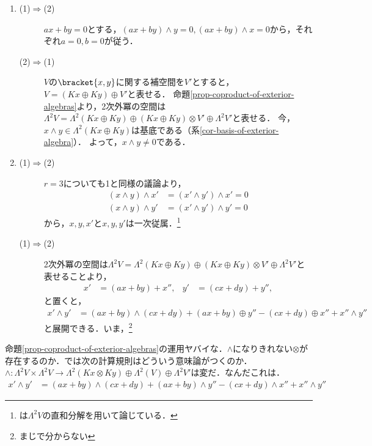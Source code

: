\documentclass[uplatex,dvipdfmx]{jsreport}
\begin{document}
\begin{Proof}\mbox{}
    \begin{enumerate}
        \item \begin{description}
            \item[(1)$\Rightarrow$(2)] $ax+by=0$とする，$(ax+by)\wedge y=0,(ax+by)\wedge x=0$から，それぞれ$a=0,b=0$が従う．
            \item[(2)$\Rightarrow$(1)] $V$の$\bracket{x,y}$に関する補空間を$V'$とすると，$V=(Kx\oplus Ky)\oplus V'$と表せる．
            命題\ref{prop-coproduct-of-exterior-algebras}より，2次外冪の空間は$\Lambda^2V=\Lambda^2(Kx\oplus Ky)\oplus(Kx\oplus Ky)\otimes V'\oplus\Lambda^2V'$と表せる．
            今，$x\wedge y\in\Lambda^2(Kx\oplus Ky)$は基底である（系\ref{cor-basis-of-exterior-algebra}）．
            よって，$x\wedge y\ne 0$である．
        \end{description}
        \item \begin{description}
            \item[(1)$\Rightarrow$(2)] $r=3$についても1と同様の議論より，
            \begin{align*}
                (x\wedge y)\wedge x'&=(x'\wedge y')\wedge x'=0\\
                (x\wedge y)\wedge y'&=(x'\wedge y')\wedge y'=0
            \end{align*}
            から，$x,y,x'$と$x,y,y'$は一次従属．\footnote{\cite{斎藤毅-線型代数}は$\Lambda^2V$の直和分解を用いて論じている．}
            \item[(1)$\Rightarrow$(2) \cite{斎藤毅-線型代数}] 
            2次外冪の空間は$\Lambda^2V=\Lambda^2(Kx\oplus Ky)\oplus(Kx\oplus Ky)\otimes V'\oplus\Lambda^2V'$と表せることより，
            \begin{align*}
                x'&=(ax+by)+x'',&y'&=(cx+dy)+y'',
            \end{align*}
            と置くと，
            \begin{align*}
                x'\wedge y'&=(ax+by)\wedge(cx+dy)+(ax+by)\oplus y''-(cx+dy)\oplus x''+x''\wedge y''
            \end{align*}
            と展開できる．いま，\footnote{まじで分からない}
        \end{description}
    \end{enumerate}
\end{Proof}
\begin{remarks}
    命題\ref{prop-coproduct-of-exterior-algebras}の運用ヤバイな．$\wedge$になりきれない$\otimes$が存在するのか．では次の計算規則はどういう意味論がつくのか．$\wedge:\Lambda^2V\times\Lambda^2V\to\Lambda^2(Kx\otimes Ky)\oplus\Lambda^2(V)\oplus\Lambda^2V'$は変だ．なんだこれは．
    \begin{align*}
        x'\wedge y'&=(ax+by)\wedge(cx+dy)+(ax+by)\wedge y''-(cx+dy)\wedge x''+x''\wedge y''
    \end{align*}
\end{remarks}
\end{document}
